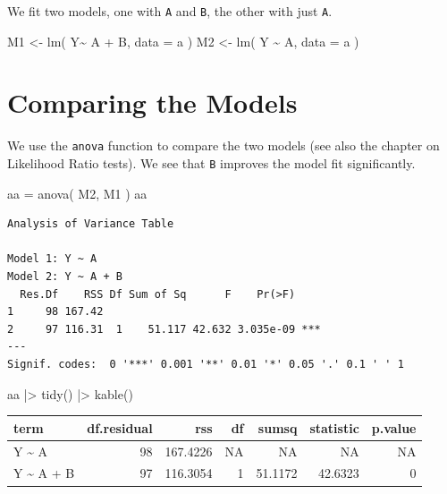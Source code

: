 \documentclass[
  letterpaper,
  DIV=11,
  numbers=noendperiod]{scrreprt}
\newenvironment{Shaded}{}{}
\newcommand{\AttributeTok}[1]{\textcolor[rgb]{0.49,0.56,0.16}{#1}}
\newcommand{\FunctionTok}[1]{\textcolor[rgb]{0.02,0.16,0.49}{#1}}
\newcommand{\NormalTok}[1]{#1}
\newcommand{\OtherTok}[1]{\textcolor[rgb]{0.00,0.44,0.13}{#1}}
\newcommand{\SpecialCharTok}[1]{\textcolor[rgb]{0.25,0.44,0.63}{#1}}
\begin{document}
We fit two models, one with \texttt{A} and \texttt{B}, the other with
just \texttt{A}.

\begin{Shaded}
\begin{Highlighting}[]
\NormalTok{M1 }\OtherTok{\textless{}{-}} \FunctionTok{lm}\NormalTok{( Y}\SpecialCharTok{\textasciitilde{}}\NormalTok{ A }\SpecialCharTok{+}\NormalTok{ B, }\AttributeTok{data =}\NormalTok{ a )}
\NormalTok{M2 }\OtherTok{\textless{}{-}} \FunctionTok{lm}\NormalTok{( Y }\SpecialCharTok{\textasciitilde{}}\NormalTok{ A, }\AttributeTok{data =}\NormalTok{ a )}
\end{Highlighting}
\end{Shaded}

\section{Comparing the Models}\label{comparing-the-models}

We use the \texttt{anova} function to compare the two models (see also
the chapter on Likelihood Ratio tests). We see that \texttt{B} improves
the model fit significantly.

\begin{Shaded}
\begin{Highlighting}[]
\NormalTok{aa }\OtherTok{=} \FunctionTok{anova}\NormalTok{( M2, M1 )}
\NormalTok{aa}
\end{Highlighting}
\end{Shaded}

\begin{verbatim}
Analysis of Variance Table

Model 1: Y ~ A
Model 2: Y ~ A + B
  Res.Df    RSS Df Sum of Sq      F    Pr(>F)    
1     98 167.42                                  
2     97 116.31  1    51.117 42.632 3.035e-09 ***
---
Signif. codes:  0 '***' 0.001 '**' 0.01 '*' 0.05 '.' 0.1 ' ' 1
\end{verbatim}

\begin{Shaded}
\begin{Highlighting}[]
\NormalTok{aa }\SpecialCharTok{|\textgreater{}} 
  \FunctionTok{tidy}\NormalTok{() }\SpecialCharTok{|\textgreater{}} 
  \FunctionTok{kable}\NormalTok{()}
\end{Highlighting}
\end{Shaded}

\begin{longtable}[]{@{}lrrrrrr@{}}
\toprule\noalign{}
term & df.residual & rss & df & sumsq & statistic & p.value \\
\midrule\noalign{}
\endhead
\bottomrule\noalign{}
\endlastfoot
Y \textasciitilde{} A & 98 & 167.4226 & NA & NA & NA & NA \\
Y \textasciitilde{} A + B & 97 & 116.3054 & 1 & 51.1172 & 42.6323 & 0 \\
\end{longtable}
\end{document}

